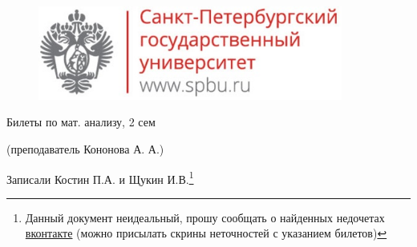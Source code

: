 \documentclass[11pt, fleqn]{article}
\begin{document}
  \begin{figure}[H]
      \includegraphics[width=10cm]{../../../template/spsu.jpg}
      \centering
  \end{figure}
  \vspace*{\fill}
  \begin{center}
    \huge Билеты по мат. анализу, 2 сем

    \Large (преподаватель Кононова А. А.)

    \large Записали Костин П.А. и Щукин И.В.\footnote{Данный документ неидеальный, прошу сообщать о найденных недочетах \href{https://vk.com/drab_existence_a}{вконтакте} (можно присылать скрины неточностей с указанием билетов)}
  \end{center}
  \vspace*{\fill}
  \vspace*{\fill}

  \newpage
  \tableofcontents
  \newpage

  

  

  

  

  

  

  
\end{document}
